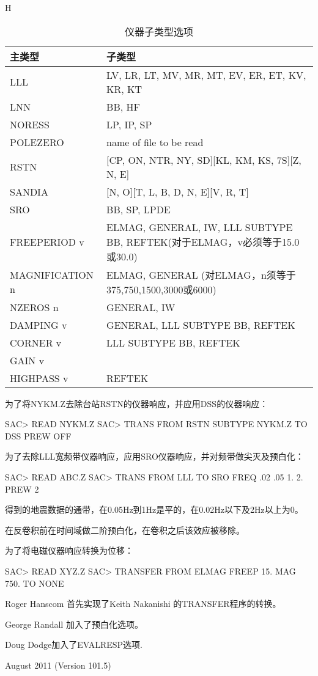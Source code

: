 \begin{table}{H}
\centering
\caption{仪器子类型选项}
\begin{tabular}{ll}
\toprule
主类型	&	子类型	\\
\midrule
LLL       &       LV, LR, LT, MV, MR, MT, EV, ER, ET, KV, KR, KT	\\
LNN       &    	  BB, HF	\\
NORESS    &   	  LP, IP, SP	\\
POLEZERO  &    	  name of file to be read	\\
RSTN      &    	  [CP, ON, NTR, NY, SD][KL, KM, KS, 7S][Z, N, E]	\\
SANDIA    &   	  [N, O][T, L, B, D, N, E][V, R, T]	\\
SRO       &       BB, SP, LPDE	\\
FREEPERIOD v &   ELMAG, GENERAL, IW, LLL SUBTYPE BB, REFTEK(对于ELMAG，v必须等于15.0或30.0)	\\
MAGNIFICATION n & ELMAG, GENERAL  (对ELMAG，n须等于375,750,1500,3000或6000)	\\
NZEROS n &     	  GENERAL, IW	\\
DAMPING v &    	  GENERAL, LLL SUBTYPE BB, REFTEK	\\
CORNER v &    	  LLL SUBTYPE BB, REFTEK	\\
GAIN v &		\\
HIGHPASS v &	  REFTEK	\\
\bottomrule
\end{tabular}
\end{table}

为了将NYKM.Z去除台站RSTN的仪器响应，并应用DSS的仪器响应：
\begin{SACCode}
SAC> READ NYKM.Z
SAC> TRANS FROM RSTN SUBTYPE NYKM.Z TO DSS PREW OFF
\end{SACCode}  	

为了去除LLL宽频带仪器响应，应用SRO仪器响应，并对频带做尖灭及预白化：
\begin{SACCode}
SAC> READ ABC.Z
SAC> TRANS FROM LLL TO SRO FREQ .02 .05 1. 2. PREW 2
\end{SACCode}
得到的地震数据的通带，在0.05Hz到1Hz是平的，在0.02Hz以下及2Hz以上为0。

在反卷积前在时间域做二阶预白化，在卷积之后该效应被移除。

为了将电磁仪器响应转换为位移：
\begin{SACCode}
SAC>  READ XYZ.Z
SAC>  TRANSFER FROM ELMAG FREEP 15. MAG 750. TO NONE
\end{SACCode}

Roger Hanscom 首先实现了Keith Nakanishi 的TRANSFER程序的转换。

George 	Randall 加入了预白化选项。

Doug Dodge加入了EVALRESP选项.

August 2011 (Version 101.5) 

